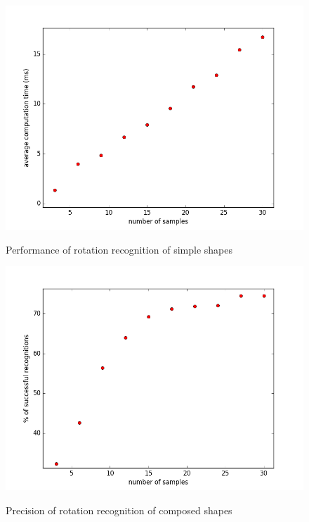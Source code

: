 \begin{figure}[!htb]
\begin{center}
\label{fig:rotation_simple_speed}
\includegraphics[width=\linewidth]{ext/rotation_simple_speed.png}
\end{center}
    \centering
    \caption{Performance of rotation recognition of simple shapes}
\end{figure}

\begin{figure}[!htb]
\begin{center}
\label{fig:rotation_comp_precision}
\includegraphics[width=\linewidth]{ext/rotation_comp_precision.png}
\end{center}
    \centering
    \caption{Precision of rotation recognition of composed shapes}
\end{figure}

